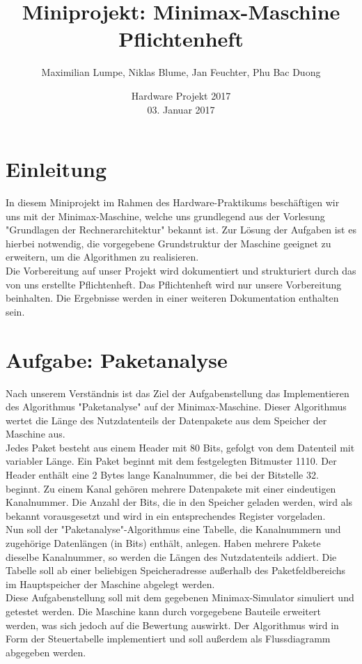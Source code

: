 \documentclass[12pt,titlepage,german,a4]{article}
\begin{document}
    \title{\bf Miniprojekt: Minimax-Maschine \\ Pflichtenheft}
    \date{Hardware Projekt 2017 \\ 03. Januar 2017}
    \author{Maximilian Lumpe, Niklas Blume, Jan Feuchter, Phu Bac Duong}
    \maketitle

    \tableofcontents

    \newpage

    \section{Einleitung}
    In diesem Miniprojekt im Rahmen des Hardware-Praktikums besch{\"a}ftigen wir uns mit der Minimax-Maschine, welche uns grundlegend aus der Vorlesung "Grundlagen der Rechnerarchitektur" bekannt ist. Zur L{\"o}sung der Aufgaben ist es hierbei notwendig, die vorgegebene Grundstruktur der Maschine geeignet zu erweitern, um die Algorithmen zu realisieren.\\Die Vorbereitung auf unser Projekt wird dokumentiert und strukturiert durch das von uns erstellte Pflichtenheft. Das Pflichtenheft wird nur unsere Vorbereitung beinhalten. Die Ergebnisse werden in einer weiteren Dokumentation enthalten sein.

    \section{Aufgabe: Paketanalyse}
    Nach unserem Verst{\"a}ndnis ist das Ziel der Aufgabenstellung das Implementieren des Algorithmus "Paketanalyse" auf der Minimax-Maschine. Dieser Algorithmus wertet die L{\"a}nge des Nutzdatenteils der Datenpakete aus dem Speicher der Maschine aus.\\Jedes Paket besteht aus einem Header mit 80 Bits, gefolgt von dem Datenteil mit variabler L{\"a}nge. Ein Paket beginnt mit dem festgelegten Bitmuster 1110. Der Header enth{\"a}lt eine 2 Bytes lange Kanalnummer, die bei der Bitstelle 32. beginnt. Zu einem Kanal geh{\"o}ren mehrere Datenpakete mit einer eindeutigen Kanalnummer. Die Anzahl der Bits, die in den Speicher geladen werden, wird als bekannt vorausgesetzt und wird in ein entsprechendes Register vorgeladen.\\Nun soll der "Paketanalyse"-Algorithmus eine Tabelle, die Kanalnummern und zugeh{\"o}rige Datenl{\"a}ngen (in Bits) enth{\"a}lt, anlegen. Haben mehrere Pakete dieselbe Kanalnummer, so werden die L{\"a}ngen des Nutzdatenteils addiert. Die Tabelle soll ab einer beliebigen Speicheradresse au{\ss}erhalb des Paketfeldbereichs im Hauptspeicher der Maschine abgelegt werden.\\Diese Aufgabenstellung soll mit dem gegebenen Minimax-Simulator simuliert und getestet werden. Die Maschine kann durch vorgegebene Bauteile erweitert werden, was sich jedoch auf die Bewertung auswirkt. Der Algorithmus wird in Form der Steuertabelle implementiert und soll au{\ss}erdem als Flussdiagramm abgegeben werden.
\end{document}
